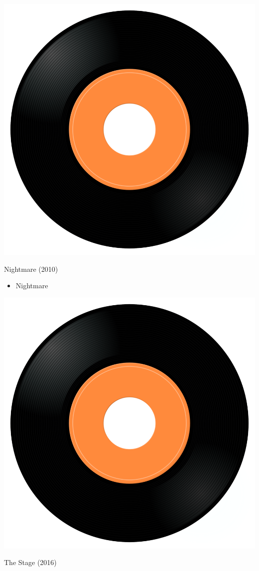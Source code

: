\begin{minipage}[t]{0.25\textwidth}
\captionsetup{type=figure}
\includegraphics[width=\textwidth]{Images/cover.png}
\caption*{Nightmare (2010)}
\end{minipage}
\begin{minipage}[t]{0.25\textwidth}\vspace{0pt}
\begin{itemize}[nosep,leftmargin=1em,labelwidth=*,align=left]
	\setlength{\itemsep}{0pt}
	\item Nightmare
\end{itemize}
\end{minipage}
\begin{minipage}[t]{0.25\textwidth}
\captionsetup{type=figure}
\includegraphics[width=\textwidth]{Images/cover.png}
\caption*{The Stage (2016)}
\end{minipage}
